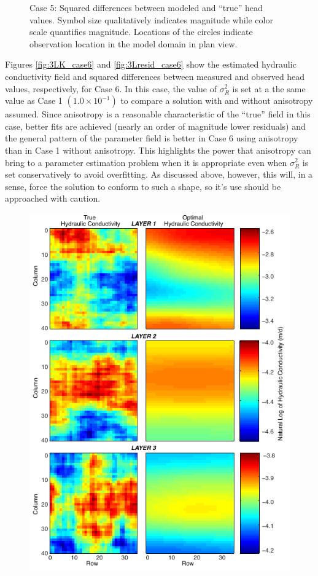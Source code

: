 \documentclass[11pt,oneside,onecolumn]{usgsreport}
\begin{document}
\begin{appendix}
\begin{figure}[H]
\caption{\label{fig:3Lresid_case5}Case 5: Squared differences between modeled
and ``true'' head values. Symbol size qualitatively indicates magnitude
while color scale quantifies magnitude. Locations of the circles indicate
observation location in the model domain in plan view.}
\end{figure}


Figures \ref{fig:3LK_case6} and \ref{fig:3Lresid_case6} show the
estimated hydraulic conductivity field and squared differences between
measured and observed head values, respectively, for Case 6. In this
case, the value of $\sigma_{R}^{2}$ is set at a the same value as
Case 1 $\left(1.0\times10^{-1}\right)$ to compare a solution with
and without anisotropy assumed. Since anisotropy is a reasonable characteristic
of the ``true'' field in this case, better fits are achieved (nearly
an order of magnitude lower residuals) and the general pattern of
the parameter field is better in Case 6 using anisotropy than in Case
1 without anisotropy. This highlights the power that anisotropy can
bring to a parameter estimation problem when it is appropriate even
when $\sigma_{R}^{2}$ is set conservatively to avoid overfitting.
As discussed above, however, this will, in a sense, force the solution
to conform to such a shape, so it's use should be approached with
caution.

\begin{figure}[H]
\begin{center}\includegraphics{figures/3KL_case6}\end{center}


\end{figure}
\end{appendix}
\end{document}
